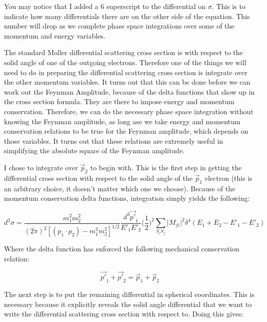 \documentclass[a4]{article}
\begin{document}
    You may notice that I added a 6 superscript to the differential on $\sigma$. This is to indicate how many differentials there are on the other side of the equation. This number will drop as we complete
    phase space integrations over some of the momentum and energy variables.
    
    The standard Moller differential scattering cross section is with respect to the solid angle of one of the outgoing electrons. Therefore one of the things we will need to do in preparing the differential
    scattering cross section is integrate over the other momentum variables. It turns out that this can be done before we can work out the Feynman Amplitude, because of the delta functions that show up in
    the cross section formula. They are there to impose energy and momentum conservation. Therefore, we can do the necessary phase space integration without knowing the Feynman amplitude, as long ase we take
    energy and momentum conservation relations to be true for the Feynman amplitude, which depends on those variables. It turns out that these relations are extremely useful in simplifying the absolute square
    of the Feynman amplitude. 

    I chose to integrate over $\vec{p}_2$ to begin with. This is the first step in getting the differential cross section with respect to the solid angle of the $\vec{p}_1$ electron (this is an arbitrary choice,
    it doesn't matter which one we choose). Because of the momentum conservation delta functions, integration simply yields the following:

    \begin{equation}
        d^3 \sigma = \frac{m_1^2 m_2^2}{(2 \pi)^2 [(p_1 \cdot p_2) - m_1^2 m_2^2]^{1/2}} \frac{d^3 \vec{p'}_1}{E'_1 E'_2} \bigg( \frac{1}{2} \bigg)^2 \sum_{S_i S_f} |M_{fi}|^2 \delta^4 (E_{1} + E_{2} - E'_{1} - E'_{2})
    \end{equation}

    Where the delta function has enforced the following mechanical conservation relation:

    \begin{equation}
        \vec{p'}_1 + \vec{p'}_2 = \vec{p}_1 + \vec{p}_2
    \end{equation}

    The next step is to put the remaining differential in spherical coordinates. This is necessary because it explicitly reveals the solid angle differential that we want to write the differential scattering
    cross section with respect to. Doing this gives:
\end{document}
